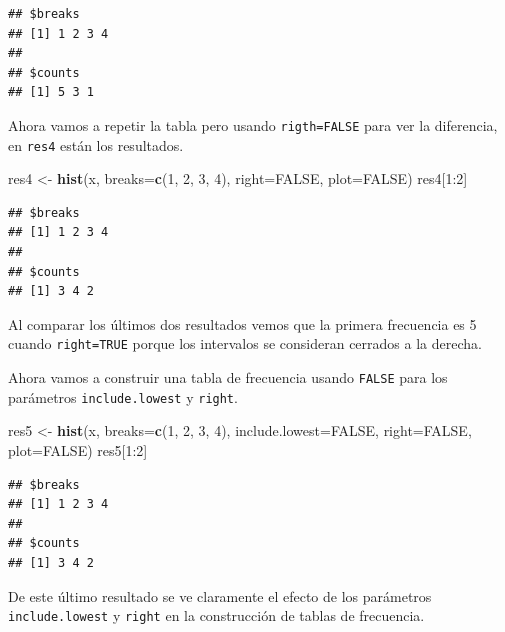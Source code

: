 \documentclass[10pt,]{krantz}
\makeatletter
\newenvironment{Shaded}{\begin{snugshade}}{\end{snugshade}}
\newcommand{\KeywordTok}[1]{\textcolor[rgb]{0.13,0.29,0.53}{\textbf{{#1}}}}
\newcommand{\DataTypeTok}[1]{\textcolor[rgb]{0.13,0.29,0.53}{{#1}}}
\newcommand{\DecValTok}[1]{\textcolor[rgb]{0.00,0.00,0.81}{{#1}}}
\newcommand{\StringTok}[1]{\textcolor[rgb]{0.31,0.60,0.02}{{#1}}}
\newcommand{\OtherTok}[1]{\textcolor[rgb]{0.56,0.35,0.01}{{#1}}}
\newcommand{\NormalTok}[1]{{#1}}
\newenvironment{kframe}{%
\medskip{}
\setlength{\fboxsep}{.8em}
 \def\at@end@of@kframe{}%
 \ifinner\ifhmode%
  \def\at@end@of@kframe{\end{minipage}}%
  \begin{minipage}{\columnwidth}%
 \fi\fi%
 \def\FrameCommand##1{\hskip\@totalleftmargin \hskip-\fboxsep
 \colorbox{shadecolor}{##1}\hskip-\fboxsep
     \hskip-\linewidth \hskip-\@totalleftmargin \hskip\columnwidth}%
 \MakeFramed {\advance\hsize-\width
   \@totalleftmargin\z@ \linewidth\hsize
   \@setminipage}}%
 {\par\unskip\endMakeFramed%
 \at@end@of@kframe}
\renewenvironment{Shaded}{\begin{kframe}}{\end{kframe}}
\makeatother
\begin{document}
\begin{verbatim}
## $breaks
## [1] 1 2 3 4
## 
## $counts
## [1] 5 3 1
\end{verbatim}

Ahora vamos a repetir la tabla pero usando \texttt{rigth=FALSE} para ver
la diferencia, en \texttt{res4} están los resultados.

\begin{Shaded}
\begin{Highlighting}[]
\NormalTok{res4 <-}\StringTok{ }\KeywordTok{hist}\NormalTok{(x, }\DataTypeTok{breaks=}\KeywordTok{c}\NormalTok{(}\DecValTok{1}\NormalTok{, }\DecValTok{2}\NormalTok{, }\DecValTok{3}\NormalTok{, }\DecValTok{4}\NormalTok{), }\DataTypeTok{right=}\OtherTok{FALSE}\NormalTok{, }\DataTypeTok{plot=}\OtherTok{FALSE}\NormalTok{)}
\NormalTok{res4[}\DecValTok{1}\NormalTok{:}\DecValTok{2}\NormalTok{]}
\end{Highlighting}
\end{Shaded}

\begin{verbatim}
## $breaks
## [1] 1 2 3 4
## 
## $counts
## [1] 3 4 2
\end{verbatim}

Al comparar los últimos dos resultados vemos que la primera frecuencia
es 5 cuando \texttt{right=TRUE} porque los intervalos se consideran
cerrados a la derecha.

Ahora vamos a construir una tabla de frecuencia usando \texttt{FALSE}
para los parámetros \texttt{include.lowest} y \texttt{right}.

\begin{Shaded}
\begin{Highlighting}[]
\NormalTok{res5 <-}\StringTok{ }\KeywordTok{hist}\NormalTok{(x, }\DataTypeTok{breaks=}\KeywordTok{c}\NormalTok{(}\DecValTok{1}\NormalTok{, }\DecValTok{2}\NormalTok{, }\DecValTok{3}\NormalTok{, }\DecValTok{4}\NormalTok{),}
             \DataTypeTok{include.lowest=}\OtherTok{FALSE}\NormalTok{, }\DataTypeTok{right=}\OtherTok{FALSE}\NormalTok{,}
             \DataTypeTok{plot=}\OtherTok{FALSE}\NormalTok{)}
\NormalTok{res5[}\DecValTok{1}\NormalTok{:}\DecValTok{2}\NormalTok{]}
\end{Highlighting}
\end{Shaded}

\begin{verbatim}
## $breaks
## [1] 1 2 3 4
## 
## $counts
## [1] 3 4 2
\end{verbatim}

De este último resultado se ve claramente el efecto de los parámetros
\texttt{include.lowest} y \texttt{right} en la construcción de tablas de
frecuencia.
\end{document}
